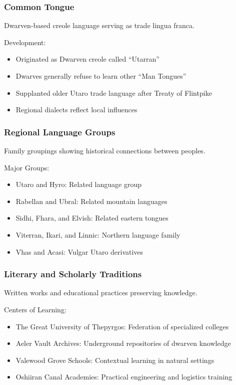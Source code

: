 \subsubsection{Common Tongue}
\label{sec:common}

Dwarven-based creole language serving as trade lingua franca.

Development:
\begin{itemize}
    \item Originated as Dwarven creole called ``Utarran''
    \item Dwarves generally refuse to learn other ``Man Tongues''
    \item Supplanted older Utaro trade language after Treaty of Flintpike
    \item Regional dialects reflect local influences
\end{itemize}

\subsubsection{Regional Language Groups}
\label{sec:languagerelations}

Family groupings showing historical connections between peoples.

Major Groups:
\begin{itemize}
    \item Utaro and Hyro: Related language group
    \item Rabellan and Ubral: Related mountain languages
    \item Sidhi, Fhara, and Elvish: Related eastern tongues
    \item Viterran, Ikari, and Linnic: Northern language family
    \item Vhas and Acasi: Vulgar Utaro derivatives
\end{itemize}

\subsubsection{Literary and Scholarly Traditions}
\label{sec:scholarship}

Written works and educational practices preserving knowledge.

Centers of Learning:
\begin{itemize}
    \item The Great University of Thepyrgos: Federation of specialized colleges
    \item Aeler Vault Archives: Underground repositories of dwarven knowledge
    \item Valewood Grove Schools: Contextual learning in natural settings
    \item Oshiiran Canal Academies: Practical engineering and logistics training
\end{itemize}

